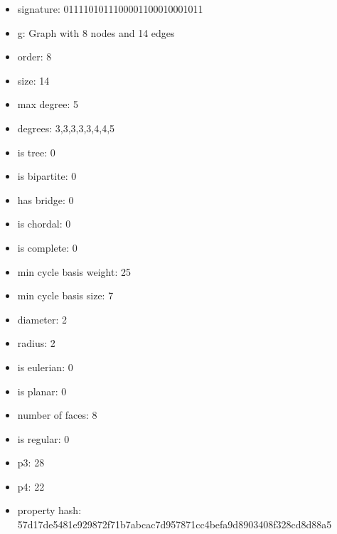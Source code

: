 \begin{itemize}
\item signature: 0111101011100001100010001011
\item g: Graph with 8 nodes and 14 edges
\item order: 8
\item size: 14
\item max degree: 5
\item degrees: 3,3,3,3,3,4,4,5
\item is tree: 0
\item is bipartite: 0
\item has bridge: 0
\item is chordal: 0
\item is complete: 0
\item min cycle basis weight: 25
\item min cycle basis size: 7
\item diameter: 2
\item radius: 2
\item is eulerian: 0
\item is planar: 0
\item number of faces: 8
\item is regular: 0
\item p3: 28
\item p4: 22
\item property hash: 57d17de5481e929872f71b7abcac7d957871cc4befa9d8903408f328cd8d88a5
\end{itemize}
\newpage
\begin{figure}
\end{figure}
